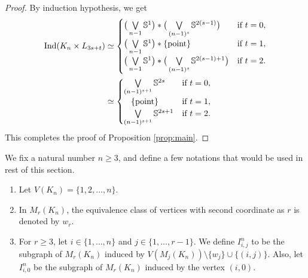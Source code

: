 \documentclass[12pt]{article}
\numberwithin{thm}{section}
\theoremstyle{definition}
\newcommand{\bS}{\mathbb{S}}
\newcommand{\ind}{{\rm{Ind}}}
\begin{document}
\begin{proof}
By  induction hypothesis, we get
\begin{align*}
 \ind(K_n\times L_{3s+t}) & \simeq \begin{cases}		
        \big{(} \bigvee\limits_{n-1} \bS^1\big{)}\ast \big{(}\bigvee\limits_{(n-1)^{s}} \bS^{2(s-1)}\big{)} & \text{if } t=0, \\
		\big{(} \bigvee\limits_{n-1} \bS^1\big{)}\ast \{\text{point}\} & \text{if} \ t= 1,\\
		\big{(} \bigvee\limits_{n-1} \bS^1\big{)}\ast\big{(}\bigvee\limits_{(n-1)^{s}} \bS^{2(s-1)+1}\big{)} & \text{if } t=2. \\ 
 \end{cases}\\
 & \simeq \begin{cases}		
        \bigvee\limits_{(n-1)^{s+1}} \bS^{2s} & \text{if } t=0, \\
	   \hspace*{0.3cm} \{\text{point}\} & \text{if} \ t= 1,\\
		\bigvee\limits_{(n-1)^{s+1}} \bS^{2s+1} & \text{if } t=2. \\ 
 \end{cases}
\end{align*}
This completes the proof of Proposition \ref{prop:main}.
	\end{proof}

 We fix a natural number $n \geq 3$, and define a few notations that would be used in rest of this section. 
 
\begin{enumerate}
    \item Let $V(K_n) = \{1,2,\dots, n\}$.
    \item In $M_r(K_n)$, the equivalence class of vertices with second coordinate as $r$  is denoted by $w_r$.
    \item For $r \geq 3$, let $i \in \{1, \ldots, n\}$ and $j \in \{1, \ldots, r-1\}$. We define $I_{i, j}^n$ to be the subgraph of $M_r(K_n)$ induced by  $V(M_{j}(K_n)) \setminus \{w_{j}\} \cup \{(i,j)\}$. Also, let $I_{i,0}^n$ be the subgraph of $M_r(K_n)$ induced by the vertex $(i,0)$.  
      \end{enumerate}
\end{document}
